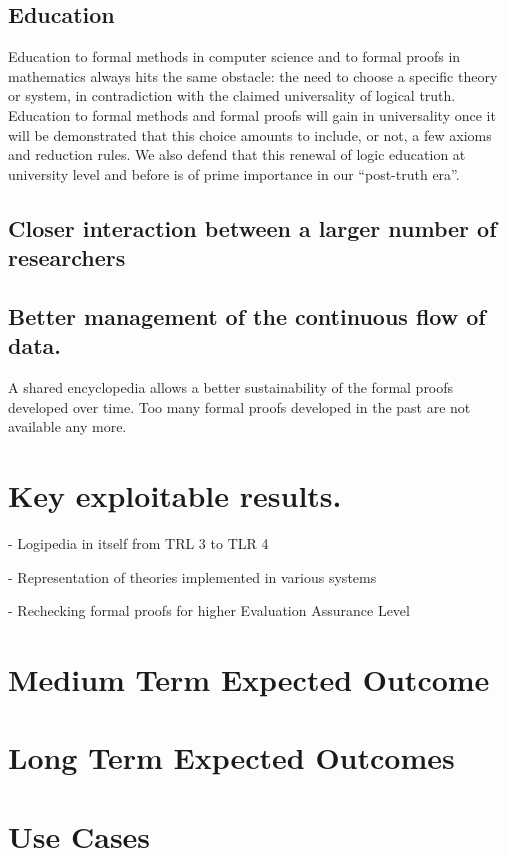 \subsection{Education}


Education to formal methods in computer science and to formal proofs
in mathematics always hits the same obstacle: the need to choose a
specific theory or system, in contradiction with the claimed
universality of logical truth. Education to formal methods and formal
proofs will gain in universality once it will be demonstrated that
this choice amounts to include, or not, a few axioms and reduction
rules. We also defend that this renewal of logic education at
university level and before is of prime importance in our ``post-truth
era''.

\subsection{Closer interaction between a larger number of
researchers}


\subsection{Better management of the continuous flow of data.}

A shared encyclopedia allows a better sustainability of the formal
proofs developed over time. Too many formal proofs developed in the
past are not available any more.

\section{Key exploitable results.}

- Logipedia in itself from TRL 3 to TLR 4

- Representation of theories implemented in various systems

- Rechecking formal proofs for higher Evaluation Assurance Level


\section{Medium Term Expected Outcome}

\section{Long Term Expected Outcomes}
\section{Use Cases}
